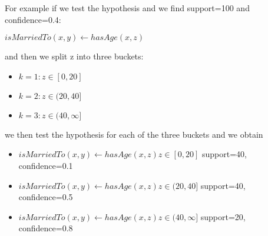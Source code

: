 For example if we test the hypothesis and we find support=100 and confidence=0.4:

\begin{center}
 \begin{math}isMarriedTo(x,y) \leftarrow hasAge(x,z)\end{math} 
\end{center}

and then we split z into three buckets:

\begin{itemize}
 \item \begin{math} k=1: z\in[0,20]\end{math}
 \item \begin{math} k=2: z\in(20,40]\end{math}
 \item \begin{math} k=3: z\in(40,\infty]\end{math}
\end{itemize}



we then test the hypothesis for each of the three buckets and we obtain

\begin{itemize}
 \item \begin{math}isMarriedTo(x,y) \leftarrow hasAge(x,z)z\in[0,20]\end{math}	support=40, confidence=0.1
 \item \begin{math}isMarriedTo(x,y) \leftarrow hasAge(x,z)z\in(20,40]\end{math}	support=40, confidence=0.5
 \item \begin{math}isMarriedTo(x,y) \leftarrow hasAge(x,z)z\in(40,\infty]\end{math}	support=20, confidence=0.8
\end{itemize}

